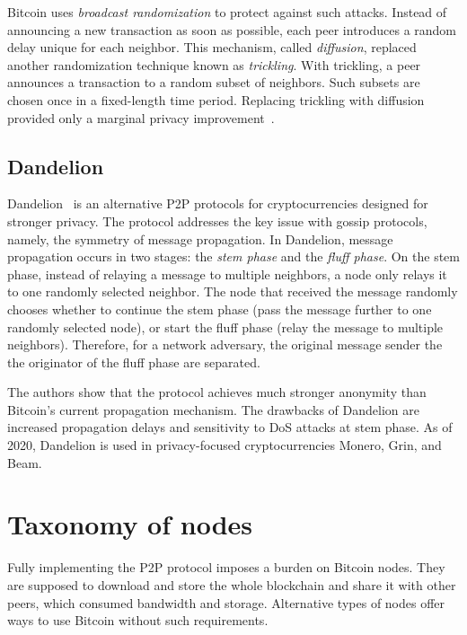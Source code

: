 Bitcoin uses \textit{broadcast randomization} to protect against such attacks.
Instead of announcing a new transaction as soon as possible, each peer introduces a random delay unique for each neighbor.
This mechanism, called \textit{diffusion}, replaced~\cite{Wuille} another randomization technique known as \textit{trickling}.
With trickling, a peer announces a transaction to a random subset of neighbors.
Such subsets are chosen once in a fixed-length time period.
Replacing trickling with diffusion provided only a marginal privacy improvement~\cite{Fanti2017}.


\subsection{Dandelion}
\label{sec:Dandelion}

Dandelion~\cite{Venkatakrishnan2017, Fanti2018} is an alternative P2P protocols for cryptocurrencies designed for stronger privacy.
The protocol addresses the key issue with gossip protocols, namely, the symmetry of message propagation.
In Dandelion, message propagation occurs in two stages: the \textit{stem phase} and the \textit{fluff phase}.
On the stem phase, instead of relaying a message to multiple neighbors, a node only relays it to one randomly selected neighbor.
The node that received the message randomly chooses whether to continue the stem phase (pass the message further to one randomly selected node), or start the fluff phase (relay the message to multiple neighbors).
Therefore, for a network adversary, the original message sender the the originator of the fluff phase are separated.

The authors show that the protocol achieves much stronger anonymity than Bitcoin's current propagation mechanism.
The drawbacks of Dandelion are increased propagation delays and sensitivity to DoS attacks at stem phase.
As of 2020, Dandelion is used in privacy-focused cryptocurrencies Monero, Grin, and Beam.


\section{Taxonomy of nodes}

Fully implementing the P2P protocol imposes a burden on Bitcoin nodes.
They are supposed to download and store the whole blockchain and share it with other peers, which consumed bandwidth and storage.
Alternative types of nodes offer ways to use Bitcoin without such requirements.

